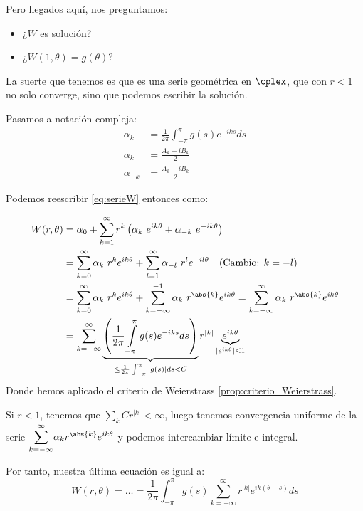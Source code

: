 		Pero llegados aquí, nos preguntamos:

		\begin{itemize}
			\item ¿$W$ es solución?
			\item ¿$W(1, \theta) = g(\theta)$?
		\end{itemize}

		La suerte que tenemos es que es una serie geométrica en $\cplex$, que con $r<1$ no solo converge, sino que podemos escribir la solución.

		Pasamos a notación compleja:
		\begin{align*}
			\alpha_k &= \frac{1}{2\pi} \int_{-\pi}^{\pi} g(s) e^{-iks} ds \\
			\alpha_k &= \frac{A_k - iB_k}{2} \\
			\alpha_{-k} &= \frac{A_k + iB_k}{2}
		\end{align*}

		Podemos reescribir \eqref{eq:serieW} entonces como:

		\begin{align*}
		W(r, \theta) &= \alpha_0 + \sum_{k=1}^{\infty} r^k \left( \alpha_k\  e^{ik\theta} + \alpha_{-k}\  e^{-ik\theta} \right)\\
%
		&= \sum_{k=0}^{\infty} \alpha_k\  r^k e^{ik\theta} + \sum_{l=1}^{\infty} \alpha_{-l}\ r^l e^{-il\theta} \quad (\text{Cambio: } k = -l)\\
%
		&= \sum_{k=0}^{\infty} \alpha_k\  r^k e^{ik\theta} + \sum_{k=-\infty}^{-1} \alpha_{k}\  r^{\abs{k}} e^{ik\theta} = \sum_{k=-\infty}^{\infty} \alpha_{k}\  r^{\abs{k}} e^{ik\theta}\\
%
		&= \sum_{k=-\infty}^{\infty} \underbrace{\left( \frac{1}{2\pi} \int\limits_{-\pi}^{\pi} g(s) e^{-iks} ds \right)}_{\leq \frac{1}{2\pi} \int_{-\pi}^{\pi} |g(s)| ds < C} r ^{|k|} \underbrace{e^{ik\theta}}_{|e^{ik\theta}| \leq 1}\\
		\end{align*}
		Donde hemos aplicado el criterio de Weierstrass \ref{prop:criterio_Weierstrass}.

		Si $r < 1$, tenemos que $\sum\limits_k Cr^{|k|} < \infty$, luego tenemos convergencia uniforme de la serie $\mathlarger{\sum}\limits_{k=-\infty}^{\infty} \alpha_{k} r^{\abs{k}} e^{ik\theta}$ y podemos intercambiar límite e integral.

		Por tanto, nuestra última ecuación es igual a:
		\[ W(r,\theta) = \dots = \frac{1}{2\pi} \int_{-\pi}^{\pi} g(s) \sum_{k=-\infty}^{\infty} r^{|k|} e^{ik(\theta-s)} ds \]

